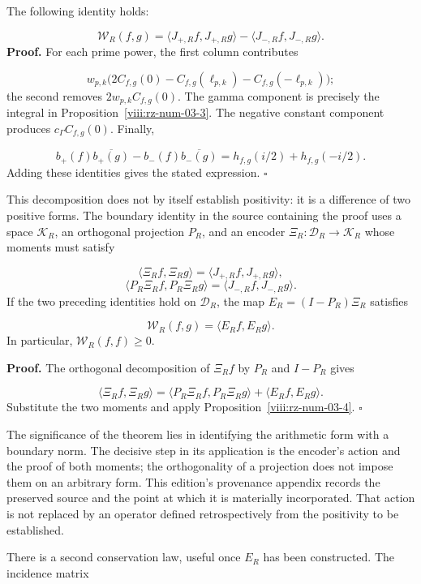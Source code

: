 The following identity holds:

\[
\mathscr W_R(f,g)
=\langle J_{+,R}f,J_{+,R}g\rangle
-\langle J_{-,R}f,J_{-,R}g\rangle.
\]
\textbf{Proof.} For each prime power, the first column contributes

\[
w_{p,k}\bigl(2C_{f,g}(0)
-C_{f,g}(\ell_{p,k})-C_{f,g}(-\ell_{p,k})\bigr);
\]
the second removes \(2w_{p,k}C_{f,g}(0)\). The gamma component is precisely the integral in Proposition~\ref{viii:rz-num-03-3}. The negative constant component produces \(c_\Gamma C_{f,g}(0)\). Finally,

\[
b_+(f)\overline{b_+(g)}-b_-(f)\overline{b_-(g)}
=h_{f,g}(i/2)+h_{f,g}(-i/2).
\]
Adding these identities gives the stated expression. \hfill\(\square\)

This decomposition does not by itself establish positivity: it is a difference of two positive forms. The boundary identity in the source containing the proof uses a space \(\mathcal K_R\), an orthogonal projection \(P_R\), and an encoder \(\Xi_R:\mathcal D_R\to\mathcal K_R\) whose moments must satisfy

\[
\langle\Xi_Rf,\Xi_Rg\rangle
=\langle J_{+,R}f,J_{+,R}g\rangle,
\]
\[
\langle P_R\Xi_Rf,P_R\Xi_Rg\rangle
=\langle J_{-,R}f,J_{-,R}g\rangle.
\]
If the two preceding identities hold on \(\mathcal D_R\), the map \(E_R=(I-P_R)\Xi_R\) satisfies

\[
\mathscr W_R(f,g)=\langle E_Rf,E_Rg\rangle.
\]
In particular, \(\mathscr W_R(f,f)\geq0\).

\textbf{Proof.} The orthogonal decomposition of \(\Xi_Rf\) by \(P_R\) and \(I-P_R\) gives

\[
\langle\Xi_Rf,\Xi_Rg\rangle
=\langle P_R\Xi_Rf,P_R\Xi_Rg\rangle
+\langle E_Rf,E_Rg\rangle.
\]
Substitute the two moments and apply Proposition~\ref{viii:rz-num-03-4}. \hfill\(\square\)

The significance of the theorem lies in identifying the arithmetic form with a boundary norm. The decisive step in its application is the encoder's action and the proof of both moments; the orthogonality of a projection does not impose them on an arbitrary form. This edition's provenance appendix records the preserved source and the point at which it is materially incorporated. That action is not replaced by an operator defined retrospectively from the positivity to be established.

There is a second conservation law, useful once \(E_R\) has been constructed. The incidence matrix

